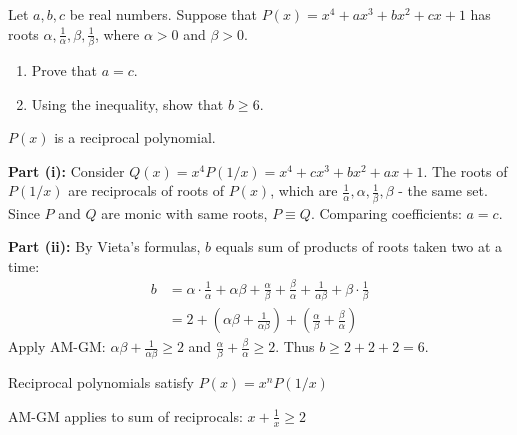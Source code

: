 \begin{problem}
Let $a, b, c$ be real numbers. Suppose that $P(x) = x^4 + ax^3 + bx^2 + cx + 1$ has roots $\alpha, \frac{1}{\alpha}, \beta, \frac{1}{\beta}$, where $\alpha > 0$ and $\beta > 0$.
\begin{enumerate}
    \item[(i)] Prove that $a = c$.
    \item[(ii)] Using the inequality, show that $b \ge 6$.
\end{enumerate}
\end{problem}

\begin{hint}
$P(x)$ is a reciprocal polynomial.
\end{hint}

\begin{solution}
\textbf{Part (i):} Consider $Q(x) = x^4 P(1/x) = x^4 + cx^3 + bx^2 + ax + 1$. The roots of $P(1/x)$ are reciprocals of roots of $P(x)$, which are $\frac{1}{\alpha}, \alpha, \frac{1}{\beta}, \beta$ - the same set. Since $P$ and $Q$ are monic with same roots, $P \equiv Q$. Comparing coefficients: $a = c$.

\textbf{Part (ii):} By Vieta's formulas, $b$ equals sum of products of roots taken two at a time:
\begin{align*}
b &= \alpha \cdot \frac{1}{\alpha} + \alpha\beta + \frac{\alpha}{\beta} + \frac{\beta}{\alpha} + \frac{1}{\alpha\beta} + \beta \cdot \frac{1}{\beta}\\
&= 2 + \left(\alpha\beta + \frac{1}{\alpha\beta}\right) + \left(\frac{\alpha}{\beta} + \frac{\beta}{\alpha}\right)
\end{align*}
Apply AM-GM: $\alpha\beta + \frac{1}{\alpha\beta} \ge 2$ and $\frac{\alpha}{\beta} + \frac{\beta}{\alpha} \ge 2$. Thus $b \ge 2 + 2 + 2 = 6$.
\end{solution}

\begin{takeaways}
\item Reciprocal polynomials satisfy $P(x) = x^n P(1/x)$
\item AM-GM applies to sum of reciprocals: $x + \frac{1}{x} \ge 2$
\end{takeaways}
